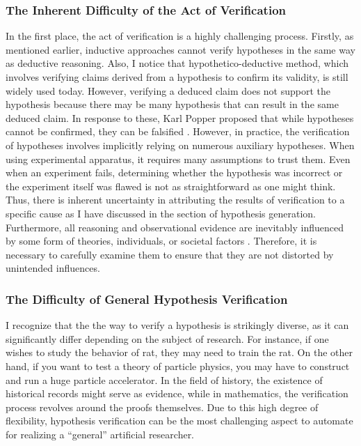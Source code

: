 \subsubsection{The Inherent Difficulty of the Act of Verification}
In the first place, the act of verification is a highly challenging process. Firstly, as mentioned earlier, inductive approaches cannot verify hypotheses in the same way as deductive reasoning. Also, I notice that hypothetico-deductive method, which involves verifying claims derived from a hypothesis to confirm its validity, is still widely used today. However, verifying a deduced claim does not support the hypothesis because there may be many hypothesis that can result in the same deduced claim. In response to these, Karl Popper proposed that while hypotheses cannot be confirmed, they can be falsified \cite{sep-scientific-method}. However, in practice, the verification of hypotheses involves implicitly relying on numerous auxiliary hypotheses. When using experimental apparatus, it requires many assumptions to trust them. Even when an experiment fails, determining whether the hypothesis was incorrect or the experiment itself was flawed is not as straightforward as one might think. Thus, there is inherent uncertainty in attributing the results of verification to a specific cause \cite{chalmers2013thing,sep-physics-experiment,sep-scientific-underdetermination} as I have discussed in the section of hypothesis generation. Furthermore, all reasoning and observational evidence are inevitably influenced by some form of theories, individuals, or societal factors \cite{sep-science-theory-observation}. Therefore, it is necessary to carefully examine them to ensure that they are not distorted by unintended influences. 

\subsubsection{The Difficulty of General Hypothesis Verification}
I recognize that the the way to verify a hypothesis is strikingly diverse, as it can significantly differ depending on the subject of research. For instance, if one wishes to study the behavior of rat, they may need to train the rat. On the other hand, if you want to test a theory of particle physics, you may have to construct and run a huge particle accelerator. In the field of history, the existence of historical records might serve as evidence, while in mathematics, the verification process revolves around the proofs themselves. Due to this high degree of flexibility, hypothesis verification can be the most challenging aspect to automate for realizing a ``general'' artificial researcher.

